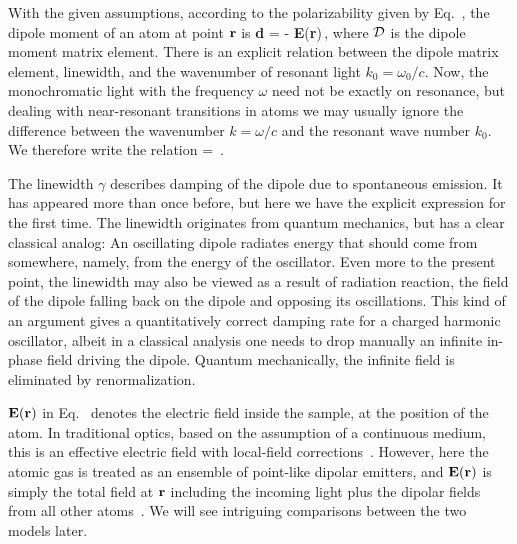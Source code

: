 With the given assumptions, according to the polarizability given by Eq.~, the dipole moment of an atom at point $\bf r$ is
\beq
{\bf d} = - {\bf E}({\bf r})\,,
\label{staticEtoD}
\eeq
where $\dip$ is the dipole moment matrix element. There is an explicit relation between the dipole matrix element, linewidth, and the wavenumber of resonant light $k_0 = \omega_0/c$. Now, the monochromatic light with the frequency $\omega$ need not be exactly on resonance, but dealing with near-resonant transitions in atoms we may usually ignore the difference between the wavenumber $k=\omega/c$ and the resonant wave number $k_0$. We therefore write the relation
\beq
\gamma = \,.
\eeq

The linewidth $\gamma$ describes damping of the dipole due to spontaneous emission. It has appeared more than once before, but here we have the explicit expression for the first time. The linewidth originates from quantum mechanics, but has a clear classical analog: An oscillating dipole radiates energy that should come from somewhere, namely, from the energy of the oscillator. Even more to the present point, the linewidth may also be viewed as a result of radiation reaction, the field of the dipole falling back on the dipole and opposing its oscillations. This kind of an argument gives a quantitatively correct damping rate for a charged harmonic oscillator, albeit in a classical analysis one needs to drop manually an infinite in-phase field driving the dipole. Quantum mechanically, the infinite field is eliminated by renormalization.

$\bf{E}(\bf{r})$ in Eq.~ denotes the electric field inside the sample, at the position of the atom. In traditional optics, based on the assumption of a continuous medium, this is an effective electric field with local-field corrections~\cite{jackson,optics}. However, here the atomic gas is treated as an ensemble of point-like dipolar emitters, and $\bf{E}(\bf{r})$ is simply the total field at $\bf{r}$ including the incoming light plus the dipolar fields from all other atoms~\cite{PhysRevLett.112.113603}. We will see intriguing comparisons between the two models later. 



